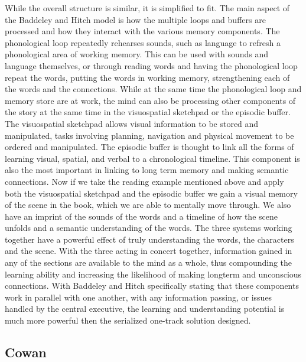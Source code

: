 While the overall structure is similar, it is simplified to fit.  The main
aspect of the Baddeley and Hitch model is how the multiple loops and buffers are
processed and how they interact with the various memory components.  The
phonological loop repeatedly rehearses sounds, such as language to refresh a
phonological area of working memory.  This can be used with sounds and language
themselves, or through reading words and having the phonological loop repeat the
words, putting the words in working memory, strengthening each of the words and
the connections.  While at the same time the phonological loop and memory store
are at work, the mind can also be processing other components of the story at
the same time in the visuospatial sketchpad or the episodic buffer. The
visuospatial sketchpad allows visual information to be stored and manipulated,
tasks involving planning, navigation and physical movement to be ordered and
manipulated.  The episodic buffer is thought to link all the forms of learning
visual, spatial, and verbal to a chronological timeline.  This component is also
the most important in linking to long term memory and making semantic
connections.  Now if we take the reading example mentioned above and apply both
the visuospatial sketchpad and the episodic buffer we gain a visual memory of
the scene in the book, which we are able to mentally move through.  We also have
an imprint of the sounds of the words and a timeline of how the scene unfolds
and a semantic understanding of the words.  The three systems working together
have a powerful effect of truly understanding the words, the characters and the
scene. With the three acting in concert together, information gained in any of
the sections are available to the mind as a whole, thus compounding the learning
ability and increasing the likelihood of making longterm and unconscious
connections.  With Baddeley and Hitch specifically stating that these components
work in parallel with one another, with any information passing, or issues
handled by the central executive, the learning and understanding potential is
much more powerful then the serialized one-track solution designed.

\subsection{Cowan}

